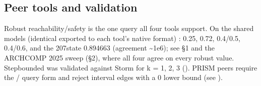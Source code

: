 \documentclass[a4paper,10pt,english]{sphinxmanual}
\begin{document}
\subsection{Peer tools and validation}
\label{\detokenize{manual/specifications:peer-tools-and-validation}}
\sphinxAtStartPar
Robust reachability/safety is the one query all four tools support. On the shared
models (identical  exported to each tool’s native format) :  0.25,  0.72,
 0.4/0.5,  0.4/0.6, and the 207\sphinxhyphen{}state
 0.894663 (agreement \textasciitilde{}1e\sphinxhyphen{}6); see  \S{}1 and the
ARCH\sphinxhyphen{}COMP 2025 sweep (\S{}2), where all four agree on every robust value. Step\sphinxhyphen{}bounded
 was validated against Storm  for k = 1, 2, 3
(). PRISM peers require the / query form and
reject interval edges with a 0 lower bound (see {\hyperref[\detokenize{manual/formats::doc}]{}}).
\end{document}
